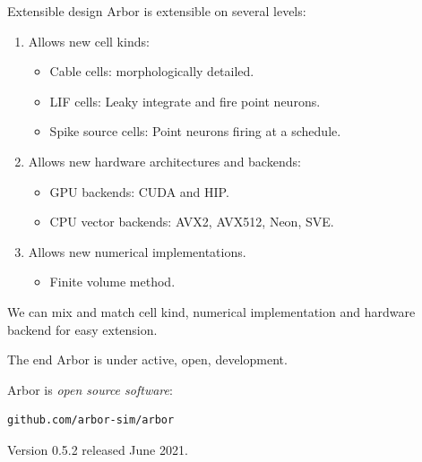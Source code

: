 \documentclass[aspectratio=43]{beamer}
\newcommand{\arbor}{{\ttfamily Arbor}\xspace}
\begin{document}

\begin{frame}[fragile]{Extensible design}
Arbor is extensible on several levels: 
\begin{enumerate}
    \item Allows new cell kinds: 
	\begin{itemize}
        \item Cable cells: morphologically detailed.
        \item LIF cells: Leaky integrate and fire point neurons.
        \item Spike source cells: Point neurons firing at a schedule.
	\end{itemize}
    \item Allows new hardware architectures and backends: 
	\begin{itemize}
        \item GPU backends: CUDA and HIP.
        \item CPU vector backends: AVX2, AVX512, Neon, SVE.
	\end{itemize}
    \item Allows new numerical implementations.
	\begin{itemize}
        \item Finite volume method. 
	\end{itemize}
\end{enumerate}

\vspace{10pt}

We can mix and match cell kind, numerical implementation and hardware backend for easy extension. 

\end{frame}

\begin{frame}[fragile]{The end}
    \arbor is under active, open, development.

    \vspace{10pt}

    \begin{center}
        \arbor is \emph{open source software}:\\
        \vspace{3pt}
        \begin{lstlisting}[style=talkpseudo]
                  github.com/arbor-sim/arbor
        \end{lstlisting}
    \end{center}

    Version 0.5.2 released June 2021.
\end{frame}
\end{document}
